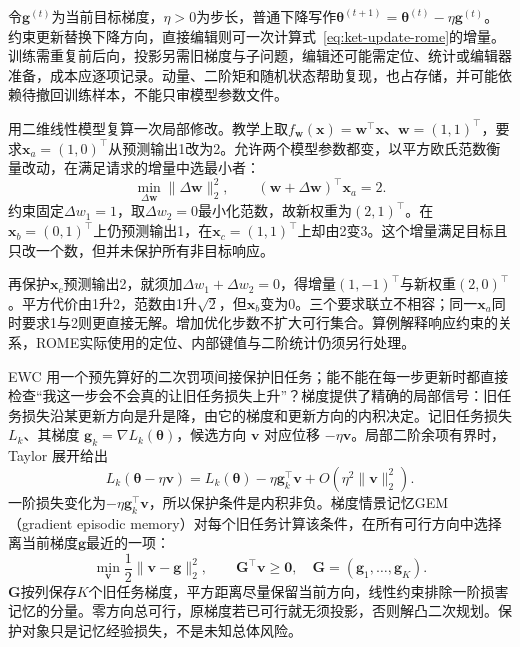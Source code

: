 令$\bm g^{(t)}$为当前目标梯度，$\eta>0$为步长，普通下降写作$\bm\theta^{(t+1)}=\bm\theta^{(t)}-\eta\bm g^{(t)}$。约束更新替换下降方向，直接编辑则可一次计算式~\eqref{eq:ket-update-rome}的增量。训练需重复前后向，投影另需旧梯度与子问题，编辑还可能需定位、统计或编辑器准备，成本应逐项记录。动量、二阶矩和随机状态帮助复现，也占存储，并可能依赖待撤回训练样本，不能只审模型参数文件。

用二维线性模型复算一次局部修改。教学上取$f_{\bm w}(\bm x)=\bm w^\top\bm x$、$\bm w=(1,1)^\top$，要求$\bm x_a=(1,0)^\top$从预测输出1改为2。允许两个模型参数都变，以平方欧氏范数衡量改动，在满足请求的增量中选最小者：
\[
\min_{\Delta\bm w}\lVert\Delta\bm w\rVert_2^2,
\qquad
(\bm w+\Delta\bm w)^\top\bm x_a=2.
\]
约束固定$\Delta w_1=1$，取$\Delta w_2=0$最小化范数，故新权重为$(2,1)^\top$。在$\bm x_b=(0,1)^\top$上仍预测输出1，在$\bm x_c=(1,1)^\top$上却由2变3。这个增量满足目标且只改一个数，但并未保护所有非目标响应。

再保护$\bm x_c$预测输出2，就须加$\Delta w_1+\Delta w_2=0$，得增量$(1,-1)^\top$与新权重$(2,0)^\top$。平方代价由1升2，范数由1升$\sqrt2$，但$\bm x_b$变为0。三个要求联立不相容；同一$\bm x_a$同时要求1与2则更直接无解。增加优化步数不扩大可行集合。算例解释响应约束的关系，ROME实际使用的定位、内部键值与二阶统计仍须另行处理。

EWC 用一个预先算好的二次罚项间接保护旧任务；能不能在每一步更新时都直接检查“我这一步会不会真的让旧任务损失上升”？梯度提供了精确的局部信号：旧任务损失沿某更新方向是升是降，由它的梯度和更新方向的内积决定。记旧任务损失 $L_k$、其梯度 $\bm g_k=\nabla L_k(\bm{\theta})$，候选方向 $\bm v$ 对应位移 $-\eta\bm v$。局部二阶余项有界时，Taylor 展开给出
\begin{equation}
L_k(\bm\theta-\eta\bm v)
=L_k(\bm\theta)-\eta\bm g_k^\top\bm v
+O(\eta^2\lVert\bm v\rVert_2^2).
\label{eq:ket-update-gradient-taylor}
\end{equation}
一阶损失变化为$-\eta\bm g_k^\top\bm v$，所以保护条件是内积非负。梯度情景记忆GEM（gradient episodic memory）对每个旧任务计算该条件，在所有可行方向中选择离当前梯度$\bm g$最近的一项：
\begin{equation}
\min_{\bm v}\frac12\lVert\bm v-\bm g\rVert_2^2,
\qquad \bm G^\top\bm v\ge\bm0,
\quad
\bm G=(\bm g_1,\ldots,\bm g_K).
\label{eq:ket-update-gem}
\end{equation}
$\bm G$按列保存$K$个旧任务梯度，平方距离尽量保留当前方向，线性约束排除一阶损害记忆的分量。零方向总可行，原梯度若已可行就无须投影，否则解凸二次规划。保护对象只是记忆经验损失，不是未知总体风险。

